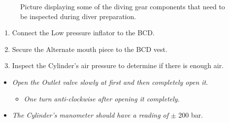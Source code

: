 \documentclass[
  letterpaper,
  DIV=11,
  numbers=noendperiod]{scrreprt}
\providecommand{\tightlist}{%
  \setlength{\itemsep}{0pt}\setlength{\parskip}{0pt}}\usepackage{longtable,booktabs,array}
\begin{document}
\begin{figure}[H]

\begin{minipage}[t]{0.50\linewidth}

{\centering 


}

\end{minipage}%
%
\begin{minipage}[t]{0.50\linewidth}

{\centering 


}

\end{minipage}%

\caption{\label{fig-dive-prep}Picture displaying some of the diving gear
components that need to be inspected during diver preparation.}

\end{figure}

\begin{enumerate}
\def\labelenumi{\arabic{enumi}.}
\setcounter{enumi}{6}
\tightlist
\item
  Connect the Low pressure inflator to the BCD.
\item
  Secure the Alternate mouth piece to the BCD vest.
\item
  Inspect the Cylinder's air pressure to determine if there is enough
  air.
\end{enumerate}

\begin{itemize}
\tightlist
\item
  \emph{Open the Outlet valve slowly at first and then completely open
  it}.

  \begin{itemize}
  \tightlist
  \item
    \emph{One turn anti-clockwise after opening it completely}.
  \end{itemize}
\item
  \emph{The Cylinder's manometer should have a reading of} \(\pm\) 200
  bar.
\end{itemize}
\end{document}
